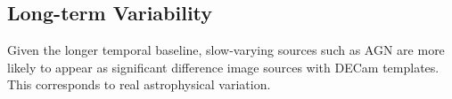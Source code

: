 \subsection{Long-term Variability}

Given the longer temporal baseline, slow-varying sources such as AGN are more likely to appear as significant difference image sources with DECam templates.
This corresponds to real astrophysical variation.


